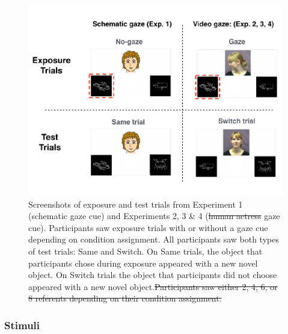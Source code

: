 \documentclass[authoryear, review]{elsarticle}
\newenvironment{CodeChunk}{}{}
\providecommand{\DIFaddtex}[1]{{\protect\color{blue}\uwave{#1}}} %
\providecommand{\DIFdeltex}[1]{{\protect\color{red}\sout{#1}}}                      %
\providecommand{\DIFaddFL}[1]{\DIFadd{#1}} %
\providecommand{\DIFdelFL}[1]{\DIFdel{#1}} %
\providecommand{\DIFaddbeginFL}{} %
\providecommand{\DIFaddendFL}{} %
\providecommand{\DIFdelbeginFL}{} %
\providecommand{\DIFdelendFL}{} %
\providecommand{\DIFadd}[1]{\texorpdfstring{\DIFaddtex{#1}}{#1}} %
\providecommand{\DIFdel}[1]{\texorpdfstring{\DIFdeltex{#1}}{}} %
\begin{document}
\begin{CodeChunk}
\begin{figure}[tb]

{\centering \DIFdelbeginFL %
\DIFdelendFL \DIFaddbeginFL \includegraphics[width=0.8\linewidth]{figs/stimuli-1} 
\DIFaddendFL 

}

\DIFdelbeginFL %
\DIFdelendFL \DIFaddbeginFL \caption[Screenshots of exposure and test trials from Experiment 1 (schematic gaze cue) and Experiments 2, 3 \& 4 (video gaze cue)]{\DIFaddendFL Screenshots of exposure and test trials from Experiment 1 (schematic gaze cue) and Experiments 2, 3 \& 4 (\DIFdelbeginFL \DIFdelFL{human actress }\DIFdelendFL \DIFaddbeginFL \DIFaddFL{video }\DIFaddendFL gaze cue). Participants saw exposure trials with or without a gaze cue depending on condition assignment. All participants saw both types of test trials: Same and Switch. On Same trials, the object that participants chose during exposure appeared with a new novel object. On Switch trials the object that participants did not choose appeared with a new novel object.\DIFdelbeginFL \DIFdelFL{Participants saw either 2, 4, 6, or 8 referents depending on their condition assignment.}\DIFdelendFL }\label{fig:stimuli}
\end{figure}
\end{CodeChunk}

\subsubsection{Stimuli}\label{stimuli}
\end{document}
